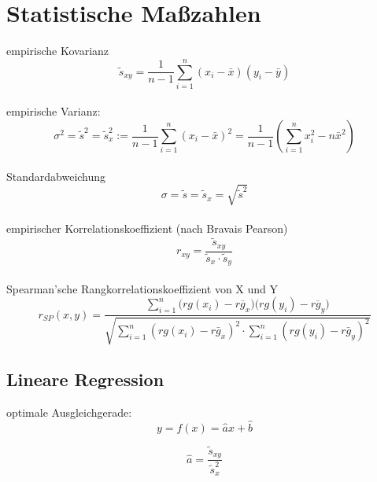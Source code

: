 \documentclass[a4paper, twocolumn]{article}
\begin{document}
\section{Statistische Maßzahlen}

    empirische Kovarianz
    \begin{displaymath}
        \tilde{s}_{xy} = \frac{1}{n-1} \sum^n_{i=1} (x_{i}-\bar{x}) (y_{i}-\bar{y})
    \end{displaymath} \\
    
    empirische Varianz:
    \begin{displaymath}
      \sigma^2 = \tilde{s}^2 = \tilde{s}^2_x := 
      \frac{1}{n-1} \sum^{n}_{i=1} (x_{i} - \bar{x})^2 = \frac{1}{n-1}(\sum^n_{i=1} x^2_i -n \bar x^2)
    \end{displaymath} \\
    
    Standardabweichung
    \begin{displaymath}
      \sigma = \tilde s = \tilde s_x = \sqrt{\tilde s ^2}
    \end{displaymath} \\
    
    empirischer Korrelationskoeffizient (nach Bravais Pearson)
    \begin{displaymath}
     r_{xy} = \frac{\tilde s_{xy}}{\tilde s_x \cdot \tilde s_y}
    \end{displaymath} \\
    
    
    Spearman'sche Rangkorrelationskoeffizient von X und Y
    \begin{equation}
      r_{SP}(x,y) = \frac
      {\sum\limits^n_{i=1} \Big(rg(x_i) - \overline{rg_x}) (rg(y_i)- \overline{rg_y} \Big) }
      { \sqrt{ \sum\limits^n_{i=1} (rg(x_i) - \bar{rg_x})^2 \cdot \sum\limits^n_{i=1} (rg(y_i) - \bar{rg_y})^2 }}
    \end{equation}
    
    \subsection{Lineare Regression}
        optimale Ausgleichgerade:
        \begin{displaymath}
            y = f(x) = \hat a x + \hat b
        \end{displaymath}
        
        \begin{displaymath}
            \hat a = \frac{\tilde s_{xy}}{\tilde s^2_x}
        \end{displaymath}
        
\end{document}
